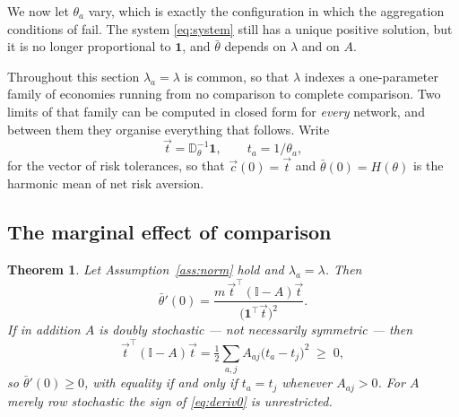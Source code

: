 \documentclass[12pt]{article}
\newtheorem{theorem}{Theorem}
\theoremstyle{definition}
\theoremstyle{remark}
\newcommand{\bth}{\bar\theta}
\newcommand{\D}{\mathbb{D}}
\begin{document}
We now let $\theta_a$ vary, which is exactly the configuration in which the
aggregation conditions of \cite{gomez} fail. The system \eqref{eq:system} still
has a unique positive solution, but it is no longer proportional to
$\mathbf 1$, and $\bth$ depends on $\lambda$ and on $A$.

Throughout this section $\lambda_a=\lambda$ is common, so that
$\lambda$ indexes a one-parameter family of economies running from no
comparison to complete comparison. Two limits of that family can be computed in
closed form for \emph{every} network, and between them they organise everything
that follows. Write
%
\begin{equation}
\vec t=\D_{\theta}^{-1}\mathbf 1,
\qquad t_a=1/\theta_a ,
\label{eq:tol}
\end{equation}
%
for the vector of risk tolerances, so that $\vec c(0)=\vec t$ and
$\bth(0)=H(\theta)$ is the harmonic mean of net risk aversion.

\subsection{The marginal effect of comparison}
\label{sec:marginal}

\begin{theorem}
\label{thm:deriv}
Let Assumption~\ref{ass:norm} hold and $\lambda_a=\lambda$. Then
%
\begin{equation}
\bth'(0)=\frac{m\,\vec t^{\top}(\mathbb{I}-A)\vec t}
{\big(\mathbf 1^{\top}\vec t\big)^{2}} .
\label{eq:deriv0}
\end{equation}
%
If in addition $A$ is doubly stochastic --- not necessarily symmetric --- then
%
\begin{equation}
\vec t^{\top}(\mathbb{I}-A)\vec t
=\tfrac12\sum_{a,j}A_{aj}\big(t_a-t_j\big)^{2}\;\geq\;0 ,
\label{eq:dirichlet}
\end{equation}
%
so $\bth'(0)\geq0$, with equality if and only if $t_a=t_j$ whenever $A_{aj}>0$.
For $A$ merely row stochastic the sign of \eqref{eq:deriv0} is unrestricted.
\end{theorem}
\end{document}
